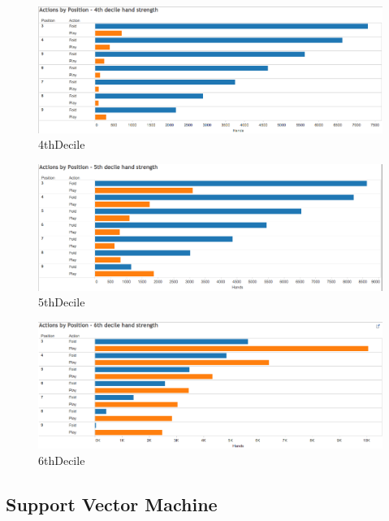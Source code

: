 \documentclass[twoside]{article}
\begin{document}
\begin{multicols}{2}
\begin{figure}[H]
  \centering
  \centerline{\includegraphics[width=1\columnwidth]{4thDecile.png}}
   \caption{4thDecile}
  \label{fig:4thDecile}
\end{figure}

\begin{figure}[H]
  \centering
  \centerline{\includegraphics[width=1\columnwidth]{5thDecile.png}}
   \caption{5thDecile}
  \label{fig:5thDecile}
\end{figure}

\begin{figure}[H]
  \centering
  \centerline{\includegraphics[width=1\columnwidth]{6thDecile.png}}
   \caption{6thDecile}
  \label{fig:6thDecile}
\end{figure}

\subsection{Support Vector Machine}


\end{multicols}
\end{document}
